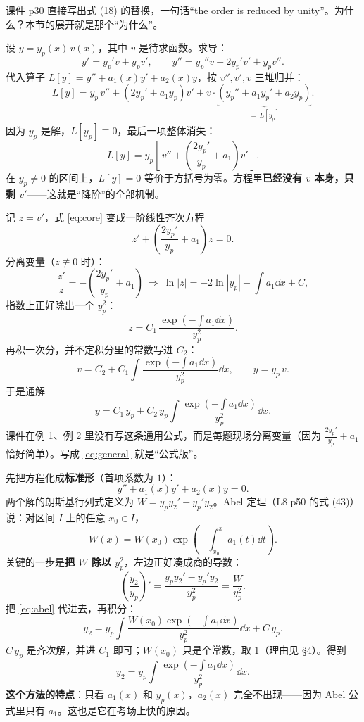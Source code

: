 \documentclass[11pt]{ctexart}
\begin{document}
课件 p30 直接写出式 (18) 的替换，一句话“the order is reduced by unity”。为什么？本节的展开就是那个“为什么”。

设 $y=y_p(x)\,v(x)$，其中 $v$ 是待求函数。求导：
\[
y'=y_p'v+y_pv',\qquad
y''=y_p''v+2y_p'v'+y_pv'' .
\]
代入算子 $L[y]=y''+a_1(x)y'+a_2(x)y$，按 $v'',v',v$ 三堆归并：
\[
L[y]=y_p\,v''+\left(2y_p'+a_1y_p\right)v'+v\cdot\underbrace{\left(y_p''+a_1y_p'+a_2y_p\right)}_{=\,L[y_p]} .
\]
因为 $y_p$ 是解，$L[y_p]\equiv0$，最后一项整体消失：
\begin{equation}\label{eq:core}
L[y]=y_p\left[\,v''+\left(\frac{2y_p'}{y_p}+a_1\right)v'\,\right].
\end{equation}
在 $y_p\neq0$ 的区间上，$L[y]=0$ 等价于方括号为零。方程里\textbf{已经没有 $v$ 本身，只剩 $v'$}——这就是“降阶”的全部机制。


记 $z=v'$，式 \eqref{eq:core} 变成一阶线性齐次方程
\[
z'+\left(\frac{2y_p'}{y_p}+a_1\right)z=0 .
\]
分离变量（$z\not\equiv0$ 时）：
\[
\frac{z'}z=-\left(\frac{2y_p'}{y_p}+a_1\right)
\ \Longrightarrow\
\ln|z|=-2\ln|y_p|-\int a_1\dd x+C ,
\]
指数上正好除出一个 $y_p^2$：
\begin{equation}\label{eq:z}
z=C_1\,\frac{\exp\left(-\int a_1\dd x\right)}{y_p^{2}} .
\end{equation}
再积一次分，并不定积分里的常数写进 $C_2$：
\[
v=C_2+C_1\int\frac{\exp\left(-\int a_1\dd x\right)}{y_p^{2}}\dd x,
\qquad
y=y_p\,v .
\]
于是通解
\begin{equation}\label{eq:general}
y=C_1\,y_p+C_2\,y_p\int\frac{\exp\left(-\int a_1\dd x\right)}{y_p^{2}}\dd x .
\end{equation}
课件在例 1、例 2 里没有写这条通用公式，而是每题现场分离变量（因为 $\frac{2y_p'}{y_p}+a_1$ 恰好简单）。写成 \eqref{eq:general} 就是“公式版”。

先把方程化成\textbf{标准形}（首项系数为 $1$）：
\[
y''+a_1(x)y'+a_2(x)y=0 .
\]
两个解的朗斯基行列式定义为 $W=y_py_2'-y_p'y_2$。Abel 定理（L8 p50 的式 (43)）说：对区间 $I$ 上的任意 $x_0\in I$，
\begin{equation}\label{eq:abel}
W(x)=W(x_0)\exp\left(-\int_{x_0}^{x}a_1(t)\dd t\right).
\end{equation}
关键的一步是\textbf{把 $W$ 除以 $y_p^2$}，左边正好凑成商的导数：
\[
\left(\frac{y_2}{y_p}\right)'=\frac{y_py_2'-y_p'y_2}{y_p^{2}}=\frac{W}{y_p^{2}} .
\]
把 \eqref{eq:abel} 代进去，再积分：
\[
y_2=y_p\int\frac{W(x_0)\exp\left(-\int a_1\dd x\right)}{y_p^{2}}\dd x+C\,y_p .
\]
$C\,y_p$ 是齐次解，并进 $C_1$ 即可；$W(x_0)$ 只是个常数，取 $1$（理由见 \S4）。得到
\begin{equation}\label{eq:abel-sol}
y_2=y_p\int\frac{\exp\left(-\int a_1\dd x\right)}{y_p^{2}}\dd x .
\end{equation}
\textbf{这个方法的特点}：只看 $a_1(x)$ 和 $y_p(x)$，$a_2(x)$ 完全不出现——因为 Abel 公式里只有 $a_1$。这也是它在考场上快的原因。
\end{document}
